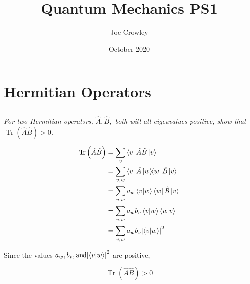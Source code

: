 \documentclass{article}
\title{Quantum Mechanics PS1}
\author{Joe Crowley}
\date{October 2020}
\begin{document}
  

\section{Hermitian Operators}
\subsection{}
\textit{For two Hermitian operators, $\hat{A}, \hat{B},$ both will all eigenvalues positive, show that $\operatorname{Tr}(\hat{A} \hat{B})>0$. }

\begin{equation*}
\begin{split}
    \operatorname{Tr}\left(\hat{A}\hat{B}\right) &= \sum_v \bra{v}\hat{A}\hat{B}\ket{v}\\
    &= \sum_{v,w} \bra{v}\hat{A}\ketbra{w}\hat{B}\ket{v}\\
    &= \sum_{v,w} a_w\braket{v}{w}\bra{w}\hat{B}\ket{v}\\
    &= \sum_{v,w}  a_w b_v\braket{v}{w}\braket{w}{v}\\
    &= \sum_{v,w}  a_w b_v{\left|\braket{v}{w}\right| }^2
\end{split}
\end{equation*}

Since the values $ a_w, b_v, \text{and} {\left|\braket{v}{w}\right| }^2$ are positive, 

$$
    \operatorname{Tr}\left(\hat{A}\hat{B}\right) >0
$$
\end{document}
